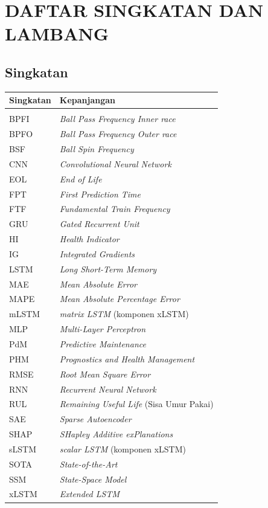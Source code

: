 
\chapter*{DAFTAR SINGKATAN DAN LAMBANG}

\section*{Singkatan}
\begin{singlespace}
\begin{tabular}{p{3cm}p{11cm}}
\textbf{Singkatan} & \textbf{Kepanjangan} \\[2pt]
\hline\\[-6pt]
BPFI  & \emph{Ball Pass Frequency Inner race} \\
BPFO  & \emph{Ball Pass Frequency Outer race} \\
BSF   & \emph{Ball Spin Frequency} \\
CNN   & \emph{Convolutional Neural Network} \\
EOL   & \emph{End of Life} \\
FPT   & \emph{First Prediction Time} \\
FTF   & \emph{Fundamental Train Frequency} \\
GRU   & \emph{Gated Recurrent Unit} \\
HI    & \emph{Health Indicator} \\
IG    & \emph{Integrated Gradients} \\
LSTM  & \emph{Long Short-Term Memory} \\
MAE   & \emph{Mean Absolute Error} \\
MAPE  & \emph{Mean Absolute Percentage Error} \\
mLSTM & \emph{matrix LSTM} (komponen xLSTM) \\
MLP   & \emph{Multi-Layer Perceptron} \\
PdM   & \emph{Predictive Maintenance} \\
PHM   & \emph{Prognostics and Health Management} \\
RMSE  & \emph{Root Mean Square Error} \\
RNN   & \emph{Recurrent Neural Network} \\
RUL   & \emph{Remaining Useful Life} (Sisa Umur Pakai) \\
SAE   & \emph{Sparse Autoencoder} \\
SHAP  & \emph{SHapley Additive exPlanations} \\
sLSTM & \emph{scalar LSTM} (komponen xLSTM) \\
SOTA  & \emph{State-of-the-Art} \\
SSM   & \emph{State-Space Model} \\
xLSTM & \emph{Extended LSTM} \\
\end{tabular}
\end{singlespace}

